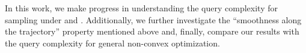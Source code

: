 \documentclass[11pt,a4paper]{article}
\begin{document}


In this work, we make progress in understanding the query complexity for sampling under  and . Additionally, we further investigate the ``smoothness along the trajectory'' property mentioned above and, finally, compare our results with the query complexity for general non-convex optimization. 





\end{document}
